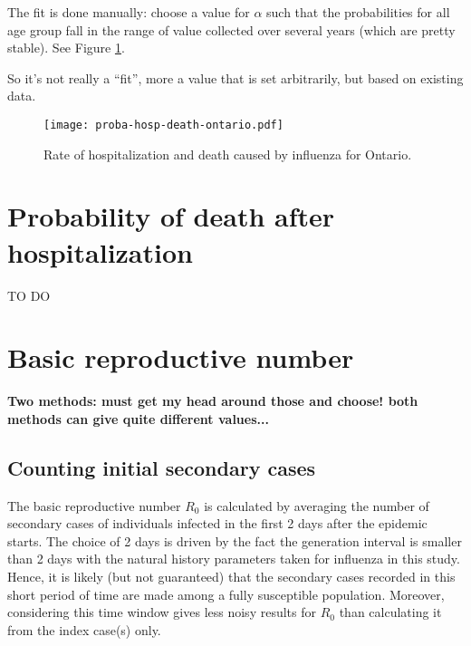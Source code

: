 \documentclass[10pt,twocolumn]{article}
\begin{document}
The fit is done manually: choose a value for $\alpha$ such that the probabilities for all age group fall in the range of value collected over several years (which are pretty stable\cite{Schanzer:2013dn}). See Figure \ref{fig:probaHospDeath}.


So it's not really a ``fit'', more a value that is set arbitrarily, but based on existing data.

\begin{figure}[htbp]
   \centering
   \texttt{[image: proba-hosp-death-ontario.pdf]} %
   \caption{Rate of hospitalization and death caused by influenza for Ontario.}
   \label{fig:probaHospDeath}
\end{figure}


\section{Probability of death after hospitalization}


TO DO


\section{Basic reproductive number}


\textbf{Two methods: must get my head around those and choose! both methods can give quite different values...}

\subsection*{Counting initial secondary cases}
The basic reproductive number $R_0$ is calculated by averaging the number of secondary cases of individuals infected in the first 2 days after the epidemic starts. 
The choice of 2 days is driven by the fact the generation interval is smaller than 2 days with the natural history parameters taken for influenza in this study. Hence, it is likely (but not guaranteed) that the secondary cases recorded in this short period of time are made among a fully susceptible population. 
Moreover, considering this time window gives less noisy results for $R_0$ than calculating it from the index case(s) only.
\end{document}
